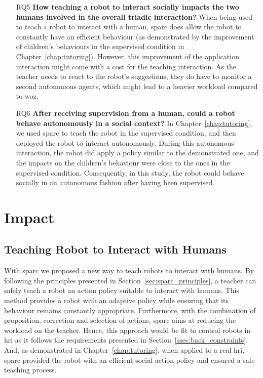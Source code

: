 \begin{itemize}
\item [RQ5] \textbf{How teaching a robot to interact socially impacts the two humans involved in the overall triadic interaction?}
When being used to teach a robot to interact with a human, \gls{sparc} does allow the robot to constantly have an efficient behaviour (as demonstrated by the improvement of children's behaviours in the supervised condition in Chapter~\ref{chap:tutoring}). However, this improvement of the application interaction might come with a cost for the teaching interaction. As the teacher needs to react to the robot's suggestions, they do have to monitor a second autonomous agents, which might lead to a heavier workload compared to \gls{woz}.

\item [RQ6] \textbf{After receiving supervision from a human, could a robot behave autonomously in a social context?}
In Chapter~\ref{chap:tutoring}, we used \gls{sparc} to teach the robot in the supervised condition, and then deployed the robot to interact autonomously. During this autonomous interaction, the robot did apply a policy similar to the demonstrated one, and the impacts on the children's behaviour were close to the ones in the supervised condition. Consequently, in this study, the robot could behave socially in an autonomous fashion after having been supervised.

\end{itemize}
\section{Impact} \label{sec:disc_impact}


\subsection{Teaching Robot to Interact with Humans}

With \gls{sparc} we proposed a new way to teach robots to interact with humans. By following the principles presented in Section~\ref{sec:sparc_principles}, a teacher can safely teach a robot an action policy suitable to interact with humans. This method provides a robot with an adaptive policy while ensuring that its behaviour remains constantly appropriate. Furthermore, with the combination of proposition, correction and selection of actions, \gls{sparc} aims at reducing the workload on the teacher. Hence, this approach would be fit to control robots in \gls{hri} as it follows the requirements presented in Section~\ref{ssec:back_constraints}. And, as demonstrated in Chapter~\ref{chap:tutoring}, when applied to a real \gls{hri}, \gls{sparc} provided the robot with an efficient social action policy and ensured a safe teaching process. 


